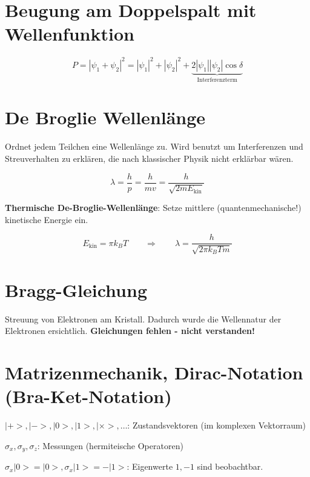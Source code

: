 \documentclass[a4paper,german,10pt,smallheadings]{scrartcl}
\begin{document}
\section{Beugung am Doppelspalt mit Wellenfunktion}

\begin{equation*}
  P = |\psi_1 + \psi_2|^2 = |\psi_1|^2 + |\psi_2|^2 + \underbrace{2 |\psi_1| |\psi_2| \cos \delta}_\text{Interferenzterm}
\end{equation*}

\section{De Broglie Wellenlänge}
Ordnet jedem Teilchen eine Wellenlänge zu. Wird benutzt um Interferenzen und
Streuverhalten zu erklären, die nach klassischer Physik nicht erklärbar wären.

\begin{equation*}
  \lambda = \frac{h}{p} = \frac{h}{mv} = \frac{h}{\sqrt{2 m E_\text{kin}}}
\end{equation*}

\textbf{Thermische De-Broglie-Wellenlänge}: Setze mittlere (quantenmechanische!) kinetische Energie
ein.

\vspace{-20pt}
\begin{equation*}
  E_\text{kin} = \pi k_B T
  \quad\quad\Rightarrow\quad\quad
  \lambda = \frac{h}{\sqrt{2 \pi k_B T m}} 
\end{equation*}

\section{Bragg-Gleichung}

Streuung von Elektronen am Kristall. Dadurch wurde die Wellennatur der
Elektronen ersichtlich. \textbf{Gleichungen fehlen - nicht verstanden!}


\section{Matrizenmechanik, Dirac-Notation (Bra-Ket-Notation)}

$|+>, |->, |0>, |1>, |\times>, \dots$: Zustandsvektoren (im komplexen Vektorraum)

$\sigma_x, \sigma_y, \sigma_z$: Messungen (hermiteische Operatoren)

$\sigma_x|0> = |0>, \sigma_x |1> = -|1>$: Eigenwerte $1, -1$ sind beobachtbar.
\end{document}
